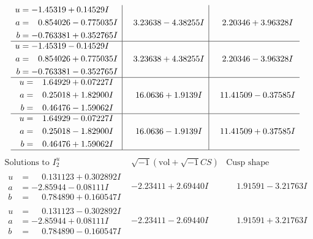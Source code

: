 \documentclass[1p]{elsarticle_modified}
\theoremstyle{definition}
\newcommand{\I}{\sqrt{-1}}
\begin{document}
$$\begin{array}{c|c|c}
\begin{aligned}
u &= -1.45319 + 0.14529 I \\
a &= \phantom{-}0.854026 - 0.775035 I \\
b &= -0.763381 + 0.352765 I\end{aligned}
 & \phantom{-}3.23638 - 4.38255 I & \phantom{-}2.20346 + 3.96328 I \\ \hline\begin{aligned}
u &= -1.45319 - 0.14529 I \\
a &= \phantom{-}0.854026 + 0.775035 I \\
b &= -0.763381 - 0.352765 I\end{aligned}
 & \phantom{-}3.23638 + 4.38255 I & \phantom{-}2.20346 - 3.96328 I \\ \hline\begin{aligned}
u &= \phantom{-}1.64929 + 0.07227 I \\
a &= \phantom{-}0.25018 + 1.82900 I \\
b &= \phantom{-}0.46476 - 1.59062 I\end{aligned}
 & \phantom{-}16.0636 + 1.9139 I & \phantom{-}11.41509 - 0.37585 I \\ \hline\begin{aligned}
u &= \phantom{-}1.64929 - 0.07227 I \\
a &= \phantom{-}0.25018 - 1.82900 I \\
b &= \phantom{-}0.46476 + 1.59062 I\end{aligned}
 & \phantom{-}16.0636 - 1.9139 I & \phantom{-}11.41509 + 0.37585 I\\
 \hline 
 \end{array}$$\newpage$$\begin{array}{c|c|c}  
\text{Solutions to }I^u_{2}& \I (\text{vol} + \sqrt{-1}CS) & \text{Cusp shape}\\
 \hline 
\begin{aligned}
u &= \phantom{-}0.131123 + 0.302892 I \\
a &= -2.85944 - 0.08111 I \\
b &= \phantom{-}0.784890 + 0.160547 I\end{aligned}
 & -2.23411 + 2.69440 I & \phantom{-}1.91591 - 3.21763 I \\ \hline\begin{aligned}
u &= \phantom{-}0.131123 - 0.302892 I \\
a &= -2.85944 + 0.08111 I \\
b &= \phantom{-}0.784890 - 0.160547 I\end{aligned}
 & -2.23411 - 2.69440 I & \phantom{-}1.91591 + 3.21763 I \\ \hline\begin{aligned}

\end{aligned}
\end{array}$$
\end{document}
